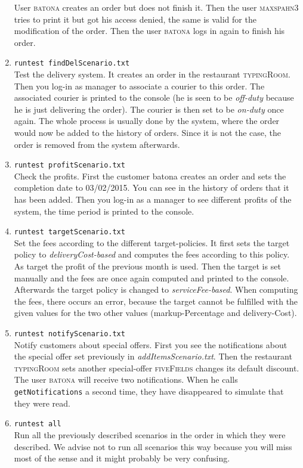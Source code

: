 \begin{enumerate}[itemsep=0mm]
		User \textsc{batona} creates an order but 
		does not finish it. Then the user \textsc{maxspahn3} tries to print it but got his
		access denied, the same is valid for the modification of the order. Then the 
		user \textsc{batona} logs in again to finish his order.
	\item \lstinline|runtest findDelScenario.txt| \\
		Test the delivery system. It creates
		an order in the restaurant \textsc{typingRoom}. Then you log-in as manager to 
		associate a courier to this order. The associated courier is printed to the console 
		(he is seen to be \textit{off-duty} because he is just delivering the order). 
		The courier is then set to be \textit{on-duty} once again. The whole process is 
		usually done by the system, where the order would now be added to the history of 
		orders. Since it is not the case, the order is removed from the system afterwards.
	\item \lstinline|runtest profitScenario.txt| \\ 
		Check the profits. First the customer batona creates an order and sets the completion
		date to \textsc{03/02/2015}. You can see in the history of orders that it has been added.
		Then you log-in as a manager to see different profits of the system,
		the time period is printed to the console.
	\item \lstinline|runtest targetScenario.txt| \\
		Set the fees according to the different target-policies. It first sets the target policy to
		\textit{deliveryCost-based} and computes the fees according to this policy. As 
		target the profit of the previous month is used. Then the target is set manually and
		the fees are once again computed and printed to the console. Afterwards the 
		target policy is changed to \textit{serviceFee-based}. When computing the fees, there
		occurs an error, because the target cannot be fulfilled with the given values for 
		the two other values (markup-Percentage and delivery-Cost).
	\item \lstinline|runtest notifyScenario.txt| \\
		Notify customers about special offers. First you see the notifications about the 
		special offer set previously in \textit{addItemsScenario.txt}. Then the restaurant
		\textsc{typingRoom} sets another special-offer \textsc{fiveFields} changes its
		default discount. The user \textsc{batona} will receive two notifications. When he 
		calls \lstinline|getNotifications| a second time, they have disappeared to 
		simulate that they were read.
	\item \lstinline|runtest all| \\
		Run all the previously described scenarios in the order in which they were 
		described. We advise not to run all scenarios this way because you will
		miss most of the sense and it might probably be very confusing.
\end{enumerate}

